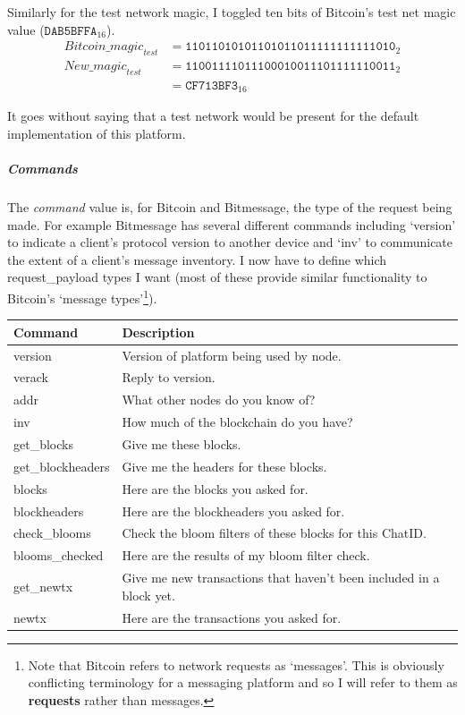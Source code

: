 \documentclass{article}
\begin{document}
Similarly for the test network magic, I toggled ten bits of Bitcoin's test net magic value ($\texttt{DAB5BFFA}_{16}$). 
\begin{align*}
    \textit{Bitcoin\_magic}_\textit{test} &= \texttt{11011010101101011011111111111010}_2   \\
    \textit{New\_magic}_\textit{test} &=  \texttt{11001111011100010011101111110011}_2      \\
                        &= \texttt{CF713BF3}_{16}
\end{align*}

It goes without saying that a test network would be present for the default implementation of this platform.

\subparagraph{Commands} The \textit{command} value is, for Bitcoin and Bitmessage, the type of the request being made. For example Bitmessage has several different commands including `version' to indicate a client's protocol version to another device and `inv' to communicate the extent of a client's message inventory. I now have to define which request\_payload types I want (most of these provide similar functionality to Bitcoin's `message types'\cite{bitmessage_messagetypes}\footnote{Note that Bitcoin refers to network requests as `messages'. This is obviously conflicting terminology for a messaging platform and so I will refer to them as \textbf{requests} rather than messages.}).
\begin{table}[H]
\centering
\begin{tabular}{|p{3cm}|p{8cm}|}
\hline
\rowcolor{tblgrey}
Command     & Description\\ \hline
version     & Version of platform being used by node. \\ \hline
verack      & Reply to version.                       \\ \hline
addr        & What other nodes do you know of?        \\ \hline
inv         & How much of the blockchain do you have? \\ \hline
get\_blocks & Give me these blocks.                   \\ \hline
get\_blockheaders & Give me the headers for these blocks. \\ \hline
blocks       & Here are the blocks you asked for.       \\ \hline
blockheaders & Here are the blockheaders you asked for.\\ \hline
check\_blooms   & Check the bloom filters of these blocks for this ChatID.\\ \hline
blooms\_checked & Here are the results of my bloom filter check.          \\ \hline
get\_newtx  & Give me new transactions that haven't been included in a block yet. \\ \hline
newtx       & Here are the transactions you asked for. \\ \hline
\end{tabular}
\end{table}
\end{document}
